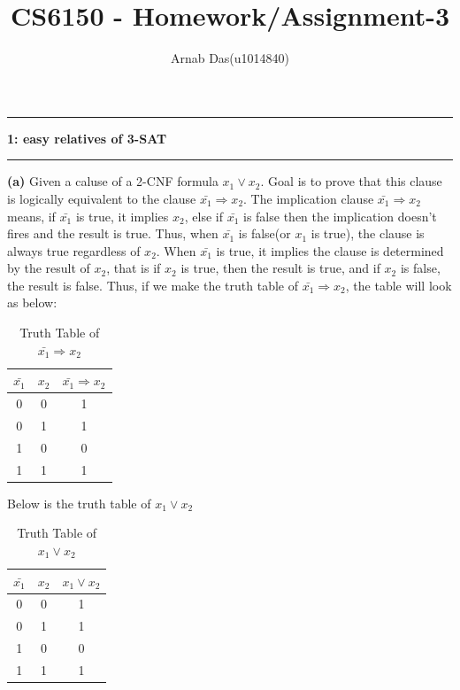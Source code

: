 \documentclass{article}
\title{CS6150 - Homework/Assignment-3}
\author{Arnab Das(u1014840)}
\newcommand\question[2]{\vspace{.25in}\hrule\textbf{#1: #2}\hrule\vspace{.10in}}
\renewcommand\part[1]{\vspace{.10in}\textbf{(#1)}}
\begin{document}
  \maketitle
  \newpage
  \newcommand\NAME{ARNAB DAS}
  \newcommand\UID{uxxxxxxx}
  \newcommand\HWNUM{3}

  \question{1}{easy relatives of 3-SAT}
	\part{a} Given a caluse of a 2-CNF formula $x_{1} \vee x_{2}$. Goal is to prove that this clause is logically equivalent to the clause $\bar{x_{1}} \Rightarrow x_{2}$.  The implication clause $\bar{x_{1}} \Rightarrow x_{2}$ means, if $\bar{x_{1}}$ is true, it implies $x_{2}$, else if $\bar{x_{1}}$ is false then the implication doesn't fires and the result is true. Thus, when $\bar{x_{1}}$ is false(or $x_{1}$ is true), the clause is always true regardless of $x_{2}$. When $\bar{x_{1}}$ is true, it implies the clause is determined by the result of $x_{2}$, that is if $x_{2}$ is true, then the result is true, and if $x_{2}$ is false, the result is false. Thus, if we make the truth table of $\bar{x_{1}} \Rightarrow x_{2}$, the table will look as below: \newline
\begin{table}[ht]
  \caption{Truth Table of $\bar{x_{1}} \Rightarrow x_{2}$}
  \centering
  \begin{tabular}{c c c }
  \hline\hline
  $\bar{x_{1}}$ & $x_{2}$ & $\bar{x_{1}} \Rightarrow x_{2}$ \\[0.5ex]
  \hline
  0 & 0 & 1 \\
  0 & 1 & 1 \\
  1 & 0 & 0 \\
  1 & 1 & 1 \\ [0.5ex]
  \end{tabular}
  \label{table:nonlin}
  \end{table}	  

Below is the truth table of $x_{1} \vee x_{2}$ \newline
\begin{table}[ht]
  \caption{Truth Table of $x_{1} \vee x_{2}$}
  \centering
  \begin{tabular}{c c c }
  \hline\hline
  $\bar{x_{1}}$ & $x_{2}$ & ${x_{1}} \vee x_{2}$ \\[0.5ex]
  \hline
  0 & 0 & 1 \\
  0 & 1 & 1 \\
  1 & 0 & 0 \\
  1 & 1 & 1 \\ [0.5ex]
  \end{tabular}
  \label{table:nonlin}
  \end{table}	 
\end{document}
